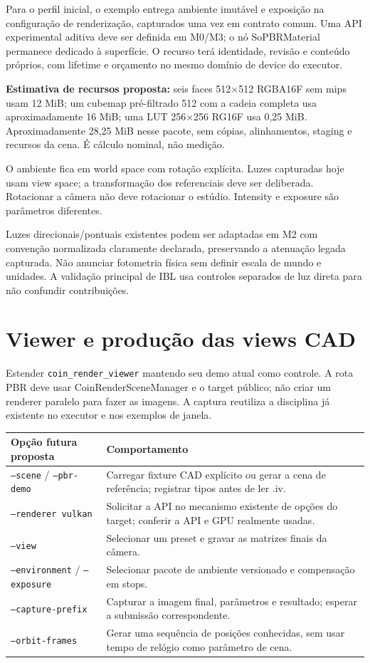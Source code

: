 \documentclass[11pt,a4paper]{article}
\begin{document}
Para o perfil inicial, o exemplo entrega ambiente imutável e exposição na configuração de renderização, capturados uma vez em contrato comum. Uma API experimental aditiva deve ser definida em M0/M3; o nó SoPBRMaterial permanece dedicado à superfície. O recurso terá identidade, revisão e conteúdo próprios, com lifetime e orçamento no mesmo domínio de device do executor.

\textbf{Estimativa de recursos proposta:} seis faces 512$\times$512 RGBA16F sem mips usam 12 MiB; um cubemap pré-filtrado 512 com a cadeia completa usa aproximadamente 16 MiB; uma LUT 256$\times$256 RG16F usa 0,25 MiB. Aproximadamente 28,25 MiB nesse pacote, sem cópias, alinhamentos, staging e recursos da cena. É cálculo nominal, não medição.

O ambiente fica em world space com rotação explícita. Luzes capturadas hoje usam view space; a transformação dos referenciais deve ser deliberada. Rotacionar a câmera não deve rotacionar o estúdio. Intensity e exposure são parâmetros diferentes.

Luzes direcionais/pontuais existentes podem ser adaptadas em M2 com convenção normalizada claramente declarada, preservando a atenuação legada capturada. Não anunciar fotometria física sem definir escala de mundo e unidades. A validação principal de IBL usa controles separados de luz direta para não confundir contribuições.

\section{Viewer e produção das views CAD}

Estender \texttt{coin\_render\_viewer} mantendo seu demo atual como controle. A rota PBR deve usar CoinRenderSceneManager e o target público; não criar um renderer paralelo para fazer as imagens. A captura reutiliza a disciplina já existente no executor e nos exemplos de janela.

\begin{center}\small
\begin{tabular}{P{.25\linewidth}P{.65\linewidth}}
\toprule Opção futura proposta & Comportamento\\\midrule
\texttt{--scene} / \texttt{--pbr-demo} & Carregar fixture CAD explícito ou gerar a cena de referência; registrar tipos antes de ler .iv.\\
\texttt{--renderer vulkan} & Solicitar a API no mecanismo existente de opções do target; conferir a API e GPU realmente usadas.\\
\texttt{--view} & Selecionar um preset e gravar as matrizes finais da câmera.\\
\texttt{--environment} / \texttt{--exposure} & Selecionar pacote de ambiente versionado e compensação em stops.\\
\texttt{--capture-prefix} & Capturar a imagem final, parâmetros e resultado; esperar a submissão correspondente.\\
\texttt{--orbit-frames} & Gerar uma sequência de posições conhecidas, sem usar tempo de relógio como parâmetro de cena.\\\bottomrule
\end{tabular}\end{center}
\end{document}
